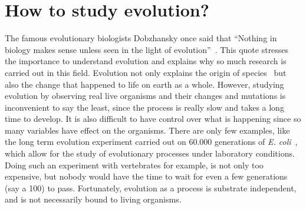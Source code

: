 \documentclass[12pt,oneside,listof=totoc,paper=a4,headings=small]{scrbook}
\begin{document}
\section{How to study evolution?}
The famous evolutionary biologists Dobzhansky once said that ``Nothing in biology makes sense unless seen in the light of evolution''~\cite{dobzhansky2013nothing}. This quote stresses the importance to understand evolution and explains why so much research is carried out in this field. Evolution not only explains the origin of species~\cite{darwin2004origin} but also the change that happened to life on earth as a whole. However, studying evolution by observing real live organisms and their changes and mutations is inconvenient to say the least, since the process is really slow and takes a long time to develop. It is also difficult to have control over what is happening since so many variables have effect on the organisms. There are only few examples, like the long term evolution experiment carried out on 60.000 generations of \textit{E. coli}~\cite{lenski2003evolutionary}, which allow for the study of evolutionary processes under laboratory conditions. Doing such an experiment with vertebrates for example, is not only too expensive, but nobody would have the time to wait for even a few generations (say a 100) to pass. Fortunately, evolution as a process is substrate independent, and is not necessarily bound to living organisms.
\end{document}
